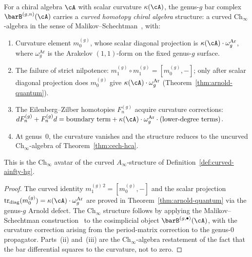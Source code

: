 \begin{theorem}
\label{thm:bar-curved-ch-infty}
For a chiral algebra $\cA$ with scalar curvature $\kappa(\cA)$, the
genus-$g$ bar complex $\barB^{(g,n)}(\cA)$ carries a \emph{curved
homotopy chiral algebra} structure: a curved
$\mathrm{Ch}_\infty$-algebra in the sense of
Malikov--Schechtman~\textup{\cite{MS24}}, with:
\begin{enumerate}[label=\textup{(\roman*)}]
\item Curvature element
 $m_0^{(g)}$, whose scalar diagonal projection is
 $\kappa(\cA)\cdot\omega_g^{\mathrm{Ar}}$,
 where $\omega_g^{\mathrm{Ar}}$ is the Arakelov $(1,1)$-form on the
 fixed genus-$g$ surface.
\item The failure of strict nilpotence:
 $m_1^{(g)} \circ m_1^{(g)} = [m_0^{(g)}, -]$; only after scalar
 diagonal projection does $m_0^{(g)}$ give
 $\kappa(\cA) \cdot \omega_g^{\mathrm{Ar}}$
 \textup{(}Theorem~\textup{\ref{thm:arnold-quantum})}.
\item The Eilenberg--Zilber homotopies $F_n^{(g)}$ acquire curvature
 corrections: $d F_n^{(g)} + F_n^{(g)} d = \text{boundary term}
 + \kappa(\cA) \cdot \omega_g^{\mathrm{Ar}}
 \cdot (\text{lower-degree terms})$.
\item At genus~$0$, the curvature vanishes and the structure reduces to
 the uncurved $\mathrm{Ch}_\infty$-algebra of
 Theorem~\textup{\ref{thm:cech-hca}}.
\end{enumerate}
This is the $\mathrm{Ch}_\infty$ avatar of the curved
$A_\infty$-structure of Definition~\textup{\ref{def:curved-ainfty-hg}}.
\end{theorem}

\begin{proof}
The curved identity $m_1^{(g)\,2}=[m_0^{(g)},-]$ and the scalar
projection
$\operatorname{tr}_{\mathrm{diag}}(m_0^{(g)})
=\kappa(\cA)\cdot\omega_g^{\mathrm{Ar}}$ are proved
in Theorem~\ref{thm:arnold-quantum} via the genus-$g$ Arnold defect.
The $\mathrm{Ch}_\infty$ structure follows by applying the
Malikov--Schechtman construction~\cite[Theorem~3.1]{MS24} to the
cosimplicial object $\barB^{(g,\bullet)}(\cA)$, with the curvature
correction arising from the period-matrix correction to the
genus-$0$ propagator. Parts~(ii) and~(iii) are the
$\mathrm{Ch}_\infty$-algebra restatement of the fact that the bar
differential squares to the curvature, not to zero.
\end{proof}

